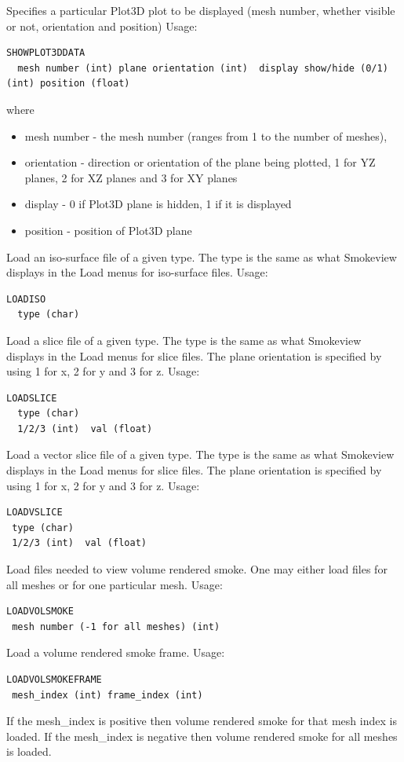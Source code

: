 \documentclass[11pt,twoside]{book}
\newcommand{\hitem}[1]{\item[{\bf #1} \hfill]}
\begin{document}
\hitem{SHOWPLOT3DDATA}Specifies a particular Plot3D plot to be
displayed (mesh number, whether visible or not, orientation and position)
Usage:
\begin{lstlisting}
SHOWPLOT3DDATA
  mesh number (int) plane orientation (int)  display show/hide (0/1) (int) position (float)
\end{lstlisting}
where
\begin{itemize}
\item mesh number - the mesh number (ranges from 1 to the number of meshes),
\item orientation - direction or orientation of the plane being plotted, 1 for YZ planes, 2 for XZ planes and 3 for XY planes
\item display - 0 if Plot3D plane is hidden, 1 if it is displayed
\item position - position of Plot3D plane
\end{itemize}

\hitem{LOADISO}Load an iso-surface file of a given type.
The type is the same as what Smokeview displays in the Load menus for iso-surface files.
Usage:
\begin{lstlisting}
LOADISO
  type (char)
\end{lstlisting}

\hitem{LOADSLICE}Load a slice file of a given type.
The type is the same as what Smokeview displays in the Load menus for slice files.  The plane orientation is specified by using 1 for x, 2 for y and 3 for z.
Usage:
\begin{lstlisting}
LOADSLICE
  type (char)
  1/2/3 (int)  val (float)
\end{lstlisting}

\hitem{LOADVSLICE}Load a vector slice file of a given type.
The type is the same as what Smokeview displays in the
Load menus for slice files.  The plane orientation is
specified by using 1 for x, 2 for y and 3 for z.
Usage:
\begin{lstlisting}
LOADVSLICE
 type (char)
 1/2/3 (int)  val (float)
\end{lstlisting}

\hitem{LOADVOLSMOKE} Load files needed to view volume rendered
smoke.  One may either load files for all meshes or for one
particular mesh.  Usage:
\begin{lstlisting}
LOADVOLSMOKE
 mesh number (-1 for all meshes) (int)
 \end{lstlisting}


\hitem{LOADVOLSMOKEFRAME} Load a volume rendered smoke frame.
Usage:
\begin{lstlisting}
LOADVOLSMOKEFRAME
 mesh_index (int) frame_index (int)
\end{lstlisting}
If the mesh\_index is positive then volume rendered smoke for that
mesh index is loaded. If the mesh\_index is negative then volume
rendered smoke for all meshes is loaded.
\end{document}
